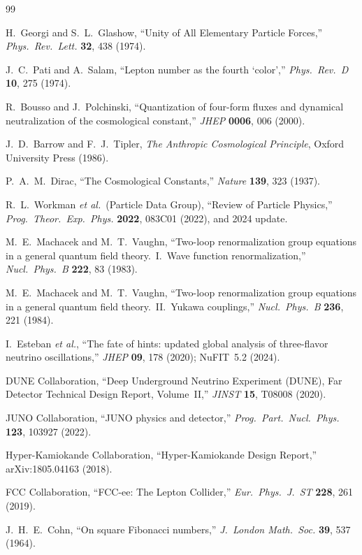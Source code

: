 \documentclass[12pt,a4paper]{article}
\begin{document}
\begin{thebibliography}{99}

  H.~Georgi and S.~L.~Glashow,
  ``Unity of All Elementary Particle Forces,''
  \emph{Phys.\ Rev.\ Lett.} \textbf{32}, 438 (1974).

  J.~C.~Pati and A.~Salam,
  ``Lepton number as the fourth `color',''
  \emph{Phys.\ Rev.\ D} \textbf{10}, 275 (1974).

  R.~Bousso and J.~Polchinski,
  ``Quantization of four-form fluxes and dynamical neutralization of the
  cosmological constant,''
  \emph{JHEP} \textbf{0006}, 006 (2000).

  J.~D.~Barrow and F.~J.~Tipler,
  \emph{The Anthropic Cosmological Principle},
  Oxford University Press (1986).

  P.~A.~M.~Dirac,
  ``The Cosmological Constants,''
  \emph{Nature} \textbf{139}, 323 (1937).

  R.~L.~Workman \emph{et al.}\ (Particle Data Group),
  ``Review of Particle Physics,''
  \emph{Prog.\ Theor.\ Exp.\ Phys.} \textbf{2022}, 083C01 (2022),
  and 2024 update.

  M.~E.~Machacek and M.~T.~Vaughn,
  ``Two-loop renormalization group equations in a general quantum field
  theory.\ I.\ Wave function renormalization,''
  \emph{Nucl.\ Phys.\ B} \textbf{222}, 83 (1983).

  M.~E.~Machacek and M.~T.~Vaughn,
  ``Two-loop renormalization group equations in a general quantum field
  theory.\ II.\ Yukawa couplings,''
  \emph{Nucl.\ Phys.\ B} \textbf{236}, 221 (1984).

  I.~Esteban \emph{et al.},
  ``The fate of hints: updated global analysis of three-flavor neutrino
  oscillations,''
  \emph{JHEP} \textbf{09}, 178 (2020); NuFIT~5.2 (2024).

  DUNE Collaboration,
  ``Deep Underground Neutrino Experiment (DUNE), Far Detector Technical
  Design Report, Volume~II,''
  \emph{JINST} \textbf{15}, T08008 (2020).

  JUNO Collaboration,
  ``JUNO physics and detector,''
  \emph{Prog.\ Part.\ Nucl.\ Phys.} \textbf{123}, 103927 (2022).

  Hyper-Kamiokande Collaboration,
  ``Hyper-Kamiokande Design Report,''
  arXiv:1805.04163 (2018).

  FCC Collaboration,
  ``FCC-ee: The Lepton Collider,''
  \emph{Eur.\ Phys.\ J.\ ST} \textbf{228}, 261 (2019).

  J.~H.~E.~Cohn,
  ``On square Fibonacci numbers,''
  \emph{J.\ London Math.\ Soc.} \textbf{39}, 537 (1964).

\end{thebibliography}
\end{document}
